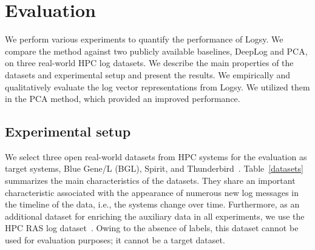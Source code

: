 \newpage

\section{Evaluation}
We perform various experiments to quantify the performance of Logsy. We compare the method against two publicly available baselines, DeepLog and PCA, on three real-world HPC log datasets. We describe the main properties of the datasets and experimental setup and present the results. We empirically and qualitatively evaluate the log vector representations from Logsy. We utilized them in the PCA method, which provided an improved performance.



\begin{table}[!b]
\caption{Target datasets.}
    \label{datasets}
\end{table}




\subsection{Experimental setup}
We select three open real-world datasets from HPC systems for the evaluation as target systems, Blue Gene/L (BGL), Spirit, and Thunderbird~\cite{oliner2007supercomputers}. Table~\ref{datasets} summarizes the main characteristics of the datasets. They share an important characteristic associated with the appearance of numerous new log messages in the timeline of the data, i.e., the systems change over time. Furthermore, as an additional dataset for enriching the auxiliary data in all experiments, we use the HPC RAS log dataset~\cite{zheng2011co}. Owing to the absence of labels, this dataset cannot be used for evaluation purposes; it cannot be a target dataset. 

